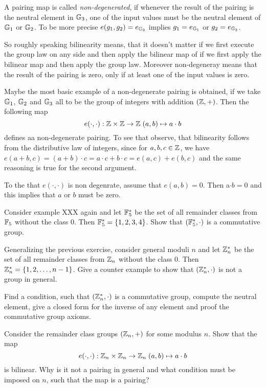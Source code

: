 A pairing map is called \textit{non-degenerated}, if whenever the result of the pairing is the neutral element in $\mathbb{G}_3$, one of the input values must be the neutral element of $\mathbb{G}_1$ or $\mathbb{G}_2$. To be more precise $e(g_1,g_2)=e_{\mathbb{G}_3}$ implies $g_1=e_{\mathbb{G}_1}$ or $g_2=e_{\mathbb{G}_2}$.

So roughly speaking bilinearity means, that it doesn't matter if we first execute the group law on any side and then apply the bilinear map of if we first apply the bilinear map and then apply the group law. Moreover non-degeneray means that the result of the pairing is zero, only if at least one of the input values is zero.
\begin{example}Maybe the most basic example of a non-degenerate pairing is obtained, if we take $\mathbb{G}_1$, $\mathbb{G}_2$ and $\mathbb{G}_3$ all to be the group of integers with addition $(\mathbb{Z},+)$. Then the following map
$$
e(\cdot,\cdot): \mathbb{Z} \times \mathbb{Z} \to \mathbb{Z} \; (a,b)\mapsto a\cdot b
$$
defines aa non-degenerate pairing. To see that observe, that bilinearity follows from the distributive law of integers, since for $a,b,c\in \mathbb{Z}$, we have $e(a+b,c)=(a+b)\cdot c = a\cdot c + b\cdot c = e(a,c)+ e(b,c)$ and the same reasoning is true for the second argument.

To the that $e(\cdot,\cdot)$ is non degenrate, assume that $e(a,b)=0$. Then a$\cdot b =0$ and this implies that $a$ or $b$ must be zero.
\end{example}

\begin{exercise} Consider example XXX again and let $\mathbb{F}_5^*$ be the set of all remainder classes from $\mathbb{F}_5$ without the class $0$. Then $\mathbb{F}_5^*=\{1,2,3,4\}$. Show that $(\mathbb{F}_5^*,\cdot)$ is a commutative group.
\end{exercise}
\begin{exercise} Generalizing the previous exercise, consider general moduli $n$ and let $\mathbb{Z}_n^*$ be the set of all remainder classes from $\mathbb{Z}_n$ without the class $0$. Then $\mathbb{Z}_n^*=\{1,2,\ldots,n-1\}$. Give a counter example to show that $(\mathbb{Z}^*_n,\cdot)$ is not a group in general.

Find a condition, such that $(\mathbb{Z}^*_n,\cdot)$ is a commutative group, compute the neutral element, give a closed form for the inverse of any element and proof the commutative group axioms.
\end{exercise}
\begin{exercise} Consider the remainder class groups $(\mathbb{Z}_n,+)$ for some modulus $n$. Show that the map
$$
e(\cdot,\cdot): \mathbb{Z}_n \times \mathbb{Z}_n \to \mathbb{Z}_n \; (a,b)\mapsto a\cdot b
$$
is bilinear. Why is it not a pairing in general and what condition must be imposed on $n$, such that the map is a pairing?
\end{exercise}
